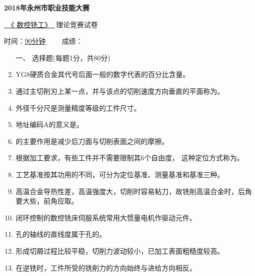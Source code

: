 \documentclass[12pt,twocolumn,landscape,UTF8,twoside]{ctexart}
\author{高星}
\begin{document}
\noindent	
	
\begin{spacing}{2}
		\begin{center}
			 \heiti 
				\bf{2018年永州市职业技能大赛}
											
					\underline{~《 数控铣工》~}\,理论竞赛试卷
				
	时间：\uline{\hspace*{0.8 cm}90分钟\hspace*{0.8cm}} ~~~~成绩：\tk[1.5]{}  
\end{center}
\end{spacing}
\vspace{-6mm}
\begin{spacing}{1.089}
	\begin{enumerate} [1、]
%
%
\item[\heiti 一、] {\heiti 选择题(每题1分，共80分)}
%
%	
\item YG8硬质合金其代号后面一般的数字代表的百分比含量。
%
\item 通过主切削刃上某一点，并与该点的切削速度方向垂直的平面称为。
%
\item 外径千分尺是测量精度等级的工件尺寸。
%
\item 地址编码A的意义是。
%
\item {}的主要作用是减少后刀面与切削表面之间的摩擦。
%
\item 根据加工要求，有些工件并不需要限制其6个自由度， 这种定位方式称为。
%
\item 工艺基准按其功用的不同，可分为定位基准、测量基准和基准三种。
%
\item 高温合金导热性差，高温强度大，切削时容易粘刀，故铣削高温合金时，后角要大些，前角应取。
%
\item 闭环控制的数控铣床伺服系统常用大惯量电机作驱动元件。
%
\item 孔的轴线的直线度属于孔的。
%
\item 形成切屑过程比较平稳，切削力波动较小，已加工表面粗糙度较高。
%
\item 在逆铣时，工件所受的铣削力的方向始终与进给方向相反。

\end{enumerate}
\end{spacing}
\end{document}

